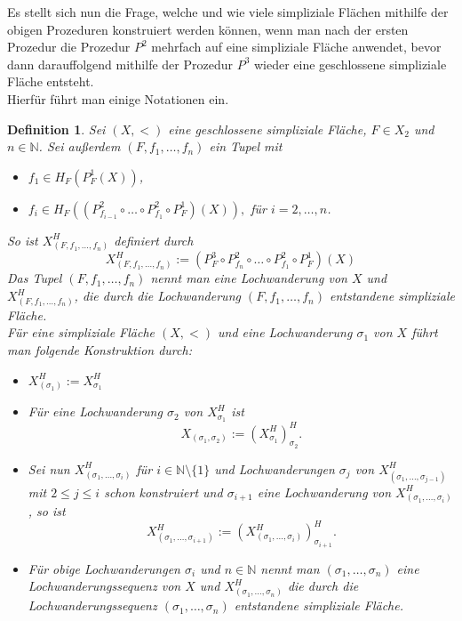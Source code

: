 \documentclass[12pt,titlepage]{article}
\newtheorem{definition}{Definition}[section]
\begin{document}
Es stellt sich nun die Frage, welche und wie viele simpliziale Flächen mithilfe der obigen Prozeduren konstruiert werden können, wenn man nach der ersten Prozedur die Prozedur $P^2$ mehrfach auf eine simpliziale Fläche anwendet, bevor dann darauffolgend mithilfe der Prozedur $P^3$ wieder eine geschlossene simpliziale Fläche entsteht.\\
Hierfür führt man einige Notationen ein.

\begin{definition}
Sei $(X,<)$ eine geschlossene simpliziale Fläche, $F \in X_2$ und $n\in \mathbb{N}$. Sei außerdem $(F,f_1,\ldots,f_n)$ ein Tupel mit
\begin{itemize}
\item $f_1 \in H_F(P_F^1(X))$,
\item $f_i \in H_F((P^2_{f_{i-1}} \circ \ldots \circ P^2_{f_1}\circ P_F^1 )(X)),$ für $i=2,\ldots ,n$.
\end{itemize}
So ist $X_{(F,f_1,\ldots,f_n)}^H$ definiert durch 
\[
X^{H}_{(F,f_1,\ldots,f_n)}:=(P_F^3\circ P^2_{f_n} \circ \ldots \circ P^2_{f_1}\circ P_F^1)(X)
\]
Das Tupel $(F,f_1,\ldots,f_n)$ nennt man eine \emph{Lochwanderung von $X$} und $X^H_{(F,f_1,\ldots,f_n)}$, die durch die Lochwanderung $(F,f_1,\ldots,f_n)$ entstandene simpliziale Fläche.\\
Für eine simpliziale Fläche $(X,<)$ und eine Lochwanderung $\sigma_1$ von $X$ führt man folgende Konstruktion durch:
\begin{itemize}
\item $X^H_{(\sigma_1)}:=X^H_{\sigma_1}$
\item Für eine Lochwanderung $\sigma_2$ von $X^H_{\sigma_1}$ ist 
\[
X_{(\sigma_1,\sigma_2)}:=(X_{\sigma_1}^H)^H_{\sigma_2}.
\]
\item Sei nun  $X_{(\sigma_1,\ldots, \sigma_i)}^H$ für $i\in \mathbb{N}\setminus\{1\}$ und Lochwanderungen $\sigma_j$ von $X^H_{(\sigma_1,\ldots,\sigma_{j-1})}$ mit $2 \leq j \leq i$ schon konstruiert und $\sigma_{i+1}$ eine Lochwanderung von $X_{(\sigma_1,\ldots, \sigma_i)}^H$, so ist
\[
X_{(\sigma_1,\ldots, \sigma_{i+1})}^H:=(X_{(\sigma_1,\ldots, \sigma_i)}^H)^H_{\sigma_{i+1}}.
\]
\item Für obige Lochwanderungen $\sigma_i$ und $n \in \mathbb{N}$ nennt man $(\sigma_1, \ldots,\sigma_n)$ eine \emph{Lochwanderungssequenz von $X$} und $X^H_{(\sigma_1,\ldots,\sigma_n)}$ die durch die Lochwanderungssequenz $(\sigma_1,\ldots,\sigma_n)$ entstandene simpliziale Fläche.
\end{itemize}
\end{definition}
\end{document}
